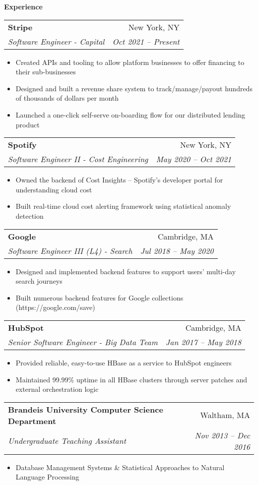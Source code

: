 \documentclass[letterpaper,11pt]{article}
\makeatletter
\newcommand{\resitem}[1]{\item #1 \vspace{-2pt}}
\newcommand{\resheading}[1]{{\large \colorbox{mygrey}{\begin{minipage}{\textwidth}{\textbf{#1 \vphantom{p\^{E}}}}\end{minipage}}}}
\newcommand{\ressubheading}[4]{
\begin{tabular*}{6.5in}{l@{\extracolsep{\fill}}r}
		\textbf{#1} & #2 \\
		\textit{#3} & \textit{#4} \\
\end{tabular*}\vspace{-6pt}}
\makeatother
\begin{document}
\resheading{Experience}
\begin{itemize}
        \item
            \ressubheading{Stripe}{New York, NY}
            {Software Engineer - Capital}{Oct 2021 -- Present}
	      {\footnotesize
	      	\begin{itemize}
	      		\resitem{Created APIs and tooling to allow platform businesses to offer financing to their sub-businesses}
	      		\resitem{Designed and built a revenue share system to track/manage/payout hundreds of thousands of dollars per month}
                         \resitem{Launched a one-click self-serve on-boarding flow for our distributed lending product}
                        
	      	\end{itemize}
	\item
	      \ressubheading{Spotify}{New York, NY}
	      {Software Engineer II - Cost Engineering}{May 2020 -- Oct 2021}
	      {\footnotesize
	      	\begin{itemize}
	      		\resitem{Owned the backend of Cost Insights -- Spotify's developer portal for understanding cloud cost}
	      		\resitem{Built real-time cloud cost alerting framework using statistical anomaly detection}
	      	\end{itemize}
	      }
	\item
	      \ressubheading{Google}{Cambridge, MA}
	      {Software Engineer III (L4) - Search}{Jul 2018 -- May 2020}
	      {\footnotesize
	      	\begin{itemize}
	      		\resitem{Designed and implemented backend features to support users' multi-day search journeys}
	      		\resitem{Built numerous backend features for Google collections (https://google.com/save)}
	      	\end{itemize}
	      }
	\item
	      \ressubheading{HubSpot}{Cambridge, MA}
	      {Senior Software Engineer - Big Data Team}{Jan 2017 -- May 2018}
	      {\footnotesize
	      	\begin{itemize}
	      		\resitem{Provided reliable, easy-to-use HBase as a service to HubSpot engineers}
	      		\resitem{Maintained 99.99\% uptime in all HBase clusters through server patches and external orchestration logic}
	      	\end{itemize}
	      }
	\item
	      \ressubheading{Brandeis University Computer Science Department}{Waltham, MA}
	      {Undergraduate Teaching Assistant}{Nov 2013 -- Dec 2016}
	      {\footnotesize
	      	\begin{itemize}
	      		\resitem{Database Management Systems \& Statistical Approaches to Natural Language Processing}
	      	\end{itemize}
	      }
	      
}
\end{itemize}
\end{document}

